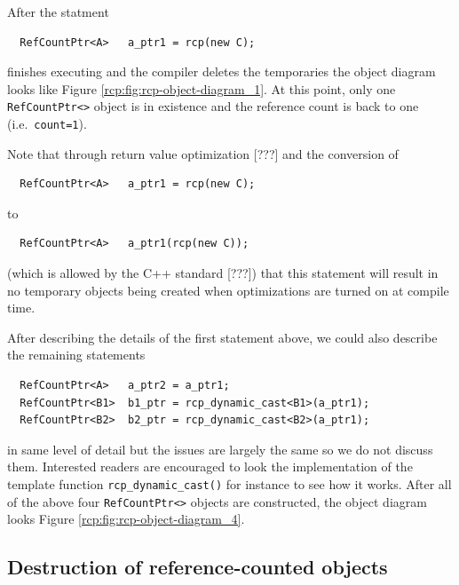 After the statment
%
{\scriptsize\begin{verbatim}
  RefCountPtr<A>   a_ptr1 = rcp(new C);
\end{verbatim}}
%
{}\noindent{}finishes executing and the compiler deletes the
temporaries the object diagram looks like Figure
{}\ref{rcp:fig:rcp-object-diagram_1}.  At this point, only one
{}\texttt{Ref\-Count\-Ptr<>} object is in existence and the reference
count is back to one (i.e.~{}\texttt{count=1}).

Note that through return value optimization [???] and the conversion
of
%
{\scriptsize\begin{verbatim}
  RefCountPtr<A>   a_ptr1 = rcp(new C);
\end{verbatim}}
%
{}\noindent{}to
%
{\scriptsize\begin{verbatim}
  RefCountPtr<A>   a_ptr1(rcp(new C));
\end{verbatim}}
%
{}\noindent{}(which is allowed by the C++ standard [???]) that this
statement will result in no temporary objects being created when
optimizations are turned on at compile time.

After describing the details of the first statement above, we could
also describe the remaining statements
%
{\scriptsize\begin{verbatim}
  RefCountPtr<A>   a_ptr2 = a_ptr1;
  RefCountPtr<B1>  b1_ptr = rcp_dynamic_cast<B1>(a_ptr1);
  RefCountPtr<B2>  b2_ptr = rcp_dynamic_cast<B2>(a_ptr1);
\end{verbatim}}
%
{}\noindent{}in same level of detail but the issues are largely the
same so we do not discuss them.  Interested readers are encouraged to
look the implementation of the template function
{}\texttt{rcp\-\_dynamic\-\_cast()} for instance to see how it works.
After all of the above four {}\texttt{Ref\-Count\-Ptr<>} objects are
constructed, the object diagram looks Figure
{}\ref{rcp:fig:rcp-object-diagram_4}.

%
\subsection{Destruction of reference-counted objects}
%

